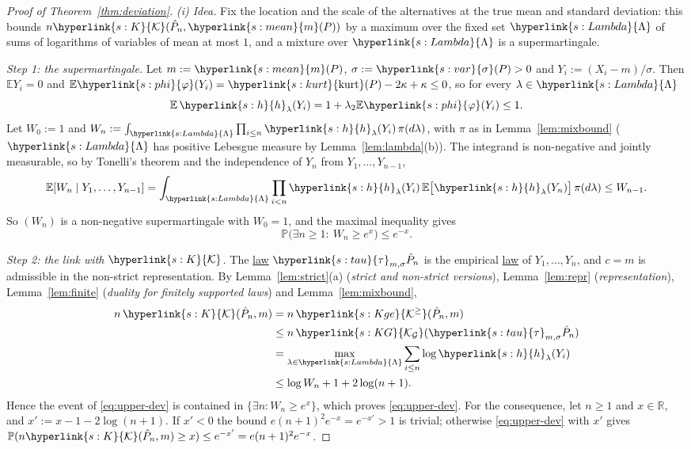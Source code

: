 \documentclass[11pt]{article}
\newcommand{\E}{\mathbb{E}}
\newcommand{\Prob}{\mathbb{P}}
\newcommand{\R}{\mathbb{R}}
\newcommand{\sy}[2]{{\hyperlink{#1}{#2}}}
\newcommand{\term}[2]{\hyperlink{#1}{#2}}
\newcommand{\mean}{\sy{s:mean}{m}}
\newcommand{\sd}{\sy{s:var}{\sigma}}
\newcommand{\kurt}{\sy{s:kurt}{\mathrm{kurt}}}
\newcommand{\Kc}{\sy{s:K}{\mathcal{K}}}
\newcommand{\Kge}{\sy{s:Kge}{\mathcal{K}^{\ge}}}
\newcommand{\phik}{\sy{s:phi}{\varphi}}
\newcommand{\KG}{\sy{s:KG}{\mathcal{K}_{\mathcal{G}}}}
\newcommand{\tauc}{\sy{s:tau}{\tau}}
\newcommand{\hl}{\sy{s:h}{h}}
\newcommand{\Lam}{\sy{s:Lambda}{\Lambda}}
\begin{document}
\begin{proof}[Proof of Theorem~\ref{thm:deviation}]
\emph{(i) Idea.} Fix the location and the scale of the alternatives at the true mean and standard deviation:
this bounds $n\Kc(\hat P_n,\mean(P))$ by a maximum over the fixed set $\Lam$ of sums of logarithms of variables of
mean at most $1$, and a mixture over $\Lam$ is a supermartingale.

\emph{Step 1: the supermartingale.} Let $m:=\mean(P)$, $\sigma:=\sd(P)>0$ and $Y_i:=(X_i-m)/\sigma$. Then $\E Y_i=0$ and
$\E\phik(Y_i)=\kurt(P)-2\kappa+\kappa\le0$, so for every $\lambda\in\Lam$
\begin{equation*}
  \E\,\hl_\lambda(Y_i)=1+\lambda_2\E\phik(Y_i)\le1 .
\end{equation*}
Let $W_0:=1$ and $W_n:=\int_\Lam\prod_{i\le n}\hl_\lambda(Y_i)\,\pi(d\lambda)$, with $\pi$ as in Lemma~\ref{lem:mixbound} ($\Lam$ has positive
Lebesgue measure by Lemma~\ref{lem:lambda}(b)). The integrand is non-negative and jointly measurable, so by
Tonelli's theorem and the independence of $Y_n$ from $Y_1,\dots,Y_{n-1}$,
\begin{equation*}
  \E[W_n\mid Y_1,\dots,Y_{n-1}]=\int_\Lam\prod_{i<n}\hl_\lambda(Y_i)\,\E\bigl[\hl_\lambda(Y_n)\bigr]\,\pi(d\lambda)\le W_{n-1}.
\end{equation*}
So $(W_n)$ is a non-negative supermartingale with $W_0=1$, and the maximal inequality \citep[Theorem~3.9]{LS} gives
\begin{equation*}
  \Prob\bigl(\exists n\ge1:\ W_n\ge e^x\bigr)\le e^{-x}.
\end{equation*}

\emph{Step 2: the link with $\Kc$.} The \term{w:law}{law} $\tauc_{m,\sigma}\hat P_n$ is the empirical \term{w:law}{law} of $Y_1,\dots,Y_n$, and $c=m$ is admissible
in the non-strict representation. By Lemma~\ref{lem:strict}(a) (\emph{strict and non-strict versions}), Lemma~\ref{lem:repr} (\emph{representation}), Lemma~\ref{lem:finite} (\emph{duality for finitely supported laws}) and Lemma~\ref{lem:mixbound},
\begin{align*}
  n\,\Kc(\hat P_n,m)&=n\,\Kge(\hat P_n,m)\\
  &\le n\,\KG(\tauc_{m,\sigma}\hat P_n)\\
  &=\max_{\lambda\in\Lam}\sum_{i\le n}\log\hl_\lambda(Y_i)\\
  &\le\log W_n+1+2\log(n+1).
\end{align*}
Hence the event of \eqref{eq:upper-dev} is contained in $\{\exists n:W_n\ge e^x\}$, which proves \eqref{eq:upper-dev}. For
the consequence, let $n\ge1$ and $x\in\R$, and $x':=x-1-2\log(n+1)$. If $x'<0$ the bound $e(n+1)^2e^{-x}=e^{-x'}>1$ is trivial;
otherwise \eqref{eq:upper-dev} with $x'$ gives $\Prob(n\Kc(\hat P_n,m)\ge x)\le e^{-x'}=e(n+1)^2e^{-x}$.


\end{proof}
\end{document}
